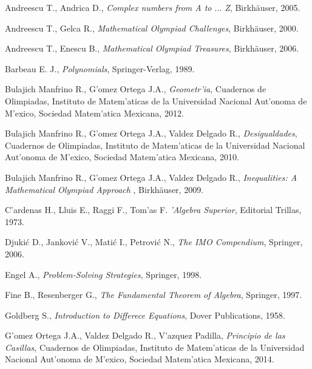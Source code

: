 
\begin{thebibliography}{99}

 Andreescu T., Andrica D., \textit{Complex numbers from A to
 $\dots$ Z}, Birkh\"auser, 2005.

 Andreescu T., Gelca R., \textit{Mathematical Olympiad 
Challenges}, Birkh\"auser, 2000.

 Andreescu T., Enescu B., \textit{Mathematical Olympiad 
Treasures}, Birkh\"auser, 2006.

 Barbeau E. J., 
\textit{Polynomials},  Springer-Verlag, 1989.

  Bulajich Manfrino R., G'omez Ortega J.A.,
\textit{Geometr'ia}, Cuadernos de Olimpiadas, Instituto de Matem'aticas de la 
Universidad Nacional Aut'onoma de M'exico, Sociedad Matem'atica Mexicana, 2012.

  Bulajich Manfrino R., G'omez Ortega J.A., Valdez Delgado 
R., \textit{Desigualdades}, Cuadernos de Olimpiadas, Instituto de Matem'aticas 
de la Universidad Nacional Aut'onoma de M'exico, Sociedad Matem'atica Mexicana,
2010.

 Bulajich Manfrino R., G'omez Ortega J.A., Valdez Delgado R., 
\textit{Inequalities: A Mathematical Olympiad Approach }, Birkh\"auser, 2009.


  C'ardenas H., Lluis E., Raggi F., Tom'as F. 
\textit{'Algebra Superior}, Editorial Trillas, 1973.


 Djuki\'c D., Jankovi\'c V., Mati\'c I., Petrovi\'c N.,
\textit{The IMO Compendium}, Springer, 2006. 

 Engel A., \textit{Problem-Solving Strategies}, Springer,
1998.

 Fine B., Resenberger G., \textit{The Fundamental Theorem of
 Algebra}, Springer, 1997.
 
  Goldberg S.,
\textit{Introduction to Differece Equations}, Dover Publications, 1958.

  G'omez Ortega J.A., Valdez Delgado R., V'azquez Padilla,
\textit{Principio de las Casillas}, Cuadernos de Olimpiadas, 
Instituto de Matem'aticas de la Universidad Nacional Aut'onoma de 
M'exico, Sociedad Matem'atica Mexicana, 2014.


\end{thebibliography}
